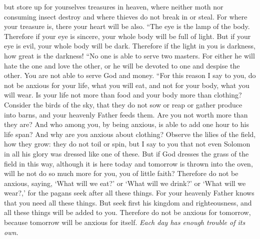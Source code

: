 \begin{biblechapter}
\verse but store up for yourselves treasures in heaven, where neither moth nor consuming insect destroy and where thieves do not break in or steal.
\verse For where your treasure is, there your heart will be also.
\verse “The eye is the lamp of the body. Therefore if your eye is sincere, your whole body will be full of light.
\verse But if your eye is evil, your whole body will be dark. Therefore if the light in you is darkness, how great is the darkness!
\verse “No one is able to serve two masters. For either he will hate the one and love the other, or he will be devoted to one and despise the other. You are not able to serve God and money.
 “For this reason I say to you, do not be anxious for your life, what you will eat, and not for your body, what you will wear. Is your life not more than food and your body more than clothing?
\verse Consider the birds of the sky, that they do not sow or reap or gather produce into barns, and your heavenly Father feeds them. Are you not worth more than they are?
\verse And who among you, by being anxious, is able to add one hour to his life span?
\verse And why are you anxious about clothing? Observe the lilies of the field, how they grow: they do not toil or spin,
\verse but I say to you that not even Solomon in all his glory was dressed like one of these.
\verse But if God dresses the grass of the field in this way, although it is here today and tomorrow is thrown into the oven, will he not do so much more for you, you of little faith?
\verse Therefore do not be anxious, saying, ‘What will we eat?’ or ‘What will we drink?’ or ‘What will we wear?,’
\verse for the pagans seek after all these things. For your heavenly Father knows that you need all these things.
\verse But seek first his kingdom and righteousness, and all these things will be added to you.
\verse Therefore do not be anxious for tomorrow, because tomorrow will be anxious for itself. \textit{Each day has enough trouble of its own.}
\end{biblechapter}

